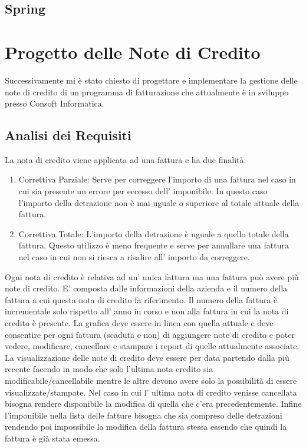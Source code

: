 \documentclass[12pt]{book}
\begin{document}
\section{Spring}
\chapter{Progetto delle Note di Credito}
Successivamente mi è stato chiesto di progettare e implementare la gestione 
delle note di credito di un programma di fatturazione che attualmente è in
sviluppo presso Consoft Informatica.
\section{Analisi dei Requisiti}
La nota di credito viene applicata ad una fattura e ha due finalità:
\begin{enumerate}
    \item Correttiva Parziale: Serve per correggere l’importo di una fattura 
        nel caso in cui sia presente un errore per eccesso dell’ imponibile. 
        In questo caso l’importo della detrazione non è mai uguale o superiore 
        al totale attuale della fattura. 
    \item Correttiva Totale: L’importo della detrazione è uguale a quello 
        totale della fattura. Questo utilizzo è meno frequente e serve per 
        annullare una fattura nel caso in cui non si riesca a risalire 
        all’ importo da correggere.
\end{enumerate}
Ogni nota di credito è relativa ad un’ unica fattura ma una fattura può avere 
più note di credito.
E’ composta dalle informazioni della azienda e il numero della fattura a cui 
questa nota di credito fa riferimento.
Il numero della fattura è incrementale solo rispetto all’ anno in corso e non 
alla fattura in cui la nota di credito è presente.
La grafica deve essere in linea con quella attuale e deve consentire per ogni 
fattura (scaduta e non) di aggiungere note di credito e poter vedere, 
modificare, cancellare e stampare i report di quelle attualmente associate.
La visualizzazione delle note di credito deve essere per data partendo dalla 
più recente facendo in modo che solo l’ultima nota credito sia 
modificabile/cancellabile mentre le altre devono avere solo la possibilità di 
essere visualizzate/stampate.
Nel caso in cui l’ ultima nota di credito venisse cancellata bisogna rendere 
disponibile la modifica di quella che c’era precedentemente.
Infine l’imponibile nella lista delle fatture bisogna che sia compreso delle 
detrazioni rendendo poi impossibile la modifica della fattura stessa essendo 
che quindi la fattura è già stata emessa.
\end{document}
